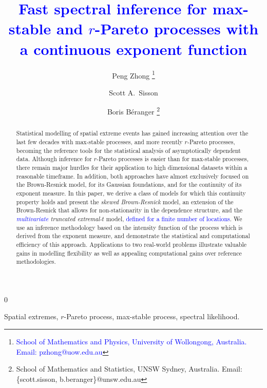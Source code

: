 \documentclass[12pt]{article}
\newcommand{\blind}{0}
\newcommand{\PZ}{\textcolor{blue}}
\newcommand{\symfoot}[2]{%
  \begingroup
  \renewcommand{\thefootnote}{\fnsymbol{footnote}}%
  \setcounter{footnote}{#1}%
  \footnote{#2}%
  \endgroup
}
\newcommand{\symfootmark}[1]{%
  \begingroup
  \renewcommand{\thefootnote}{\fnsymbol{footnote}}%
  \setcounter{footnote}{#1}%
  \footnotemark%
  \endgroup
}
\begin{document}
\title{\bf \PZ{Fast spectral inference for max-stable and $r$-Pareto processes with a continuous exponent function}}
\blind{
  \author{Peng Zhong\symfoot{1}{\PZ{School of Mathematics and Physics, University of Wollongong, Australia. Email: pzhong@uow.edu.au}}
  \and Scott A.~Sisson\symfootmark{2}
  \and Boris B\'{e}ranger\symfoot{2}{School of Mathematics and Statistics, UNSW Sydney, Australia. Email: \{scott.sisson, b.beranger\}@unsw.edu.au}}
  \maketitle
} \fi

\vspace{-8mm}
\baselineskip=25pt
\begin{abstract}
    Statistical modelling of spatial extreme events has gained increasing attention over the last few decades with max-stable processes, and more recently $r$-Pareto processes, becoming the reference tools for the statistical analysis of asymptotically dependent data. Although inference for $r$-Pareto processes is easier than for max-stable processes, there remain major hurdles for their application to high dimensional datasets within a reasonable timeframe. In addition, both approaches have almost exclusively focused on the Brown-Resnick model, for its Gaussian foundations, and for the continuity of its exponent measure. In this paper, we derive a class of models for which this continuity property holds and present the \emph{skewed Brown-Resnick} model, an extension of the Brown-Resnick that allows for non-stationarity in the dependence structure, and the \emph{\PZ{multivariate} truncated extremal-$t$} model, \PZ{defined for a finite number of locations}.
    We use an inference methodology based on the intensity function of the process which is derived from the exponent measure, and demonstrate the statistical and computational efficiency of this approach. Applications to two real-world problems illustrate valuable gains in modelling flexibility as well as appealing computational gains over reference methodologies. 
\end{abstract}

  Spatial extremes, $r$-Pareto process, max-stable process, spectral likelihood.
\end{document}
